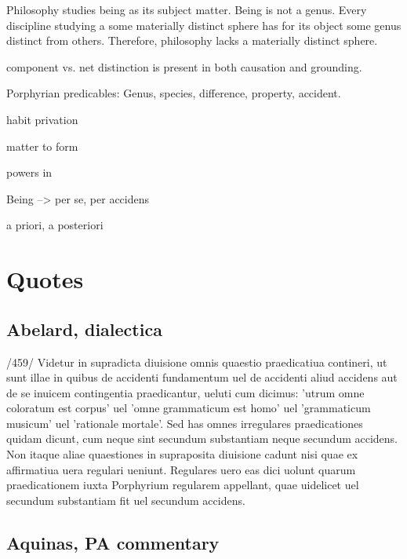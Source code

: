 Philosophy studies being as its subject matter. Being is not a genus. Every discipline studying a some materially distinct sphere has for its object some genus distinct from others. Therefore, philosophy lacks a materially distinct sphere.

component vs. net distinction is present in both causation and grounding.

Porphyrian predicables: Genus, species, difference, property, accident.

habit privation

matter to form

powers in 

Being --> per se, per accidens

a priori, a posteriori 



\section{Quotes}
\subsection{Abelard, dialectica}

/459/ Videtur in supradicta diuisione omnis quaestio praedicatiua contineri, ut sunt illae in quibus de accidenti fundamentum uel de accidenti aliud accidens aut de se inuicem contingentia praedicantur, ueluti cum dicimus: 'utrum omne coloratum est corpus' uel 'omne grammaticum est homo' uel 'grammaticum musicum' uel 'rationale mortale'. Sed has omnes irregulares praedicationes quidam dicunt, cum neque sint secundum substantiam neque secundum accidens. Non itaque aliae quaestiones in supraposita diuisione cadunt nisi quae ex affirmatiua uera regulari ueniunt. Regulares uero eas dici uolunt quarum praedicationem iuxta Porphyrium regularem appellant, quae uidelicet uel secundum substantiam fit uel secundum accidens. %
\subsection{Aquinas, PA commentary}
